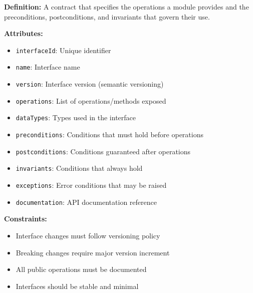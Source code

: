 \documentclass[11pt,letterpaper]{article}
\begin{document}
\begin{definitionbox}
\textbf{Definition:} A contract that specifies the operations a module provides and the preconditions, postconditions, and invariants that govern their use.

\textbf{Attributes:}
\begin{itemize}[nosep]
    \item \texttt{interfaceId}: Unique identifier
    \item \texttt{name}: Interface name
    \item \texttt{version}: Interface version (semantic versioning)
    \item \texttt{operations}: List of operations/methods exposed
    \item \texttt{dataTypes}: Types used in the interface
    \item \texttt{preconditions}: Conditions that must hold before operations
    \item \texttt{postconditions}: Conditions guaranteed after operations
    \item \texttt{invariants}: Conditions that always hold
    \item \texttt{exceptions}: Error conditions that may be raised
    \item \texttt{documentation}: API documentation reference
\end{itemize}

\textbf{Constraints:}
\begin{itemize}[nosep]
    \item Interface changes must follow versioning policy
    \item Breaking changes require major version increment
    \item All public operations must be documented
    \item Interfaces should be stable and minimal
\end{itemize}
\end{definitionbox}
\end{document}
